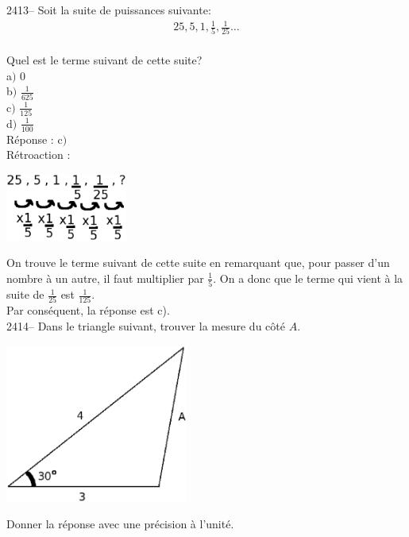 \documentclass[letterpaper, 12pt]{article}
\begin{document}
2413-- Soit la suite de puissances suivante:\\
\begin{eqnarray*}
25, 5, 1, \frac{1}{5}, \frac{1}{25} \ldots
\end{eqnarray*}\\
Quel est le terme suivant de cette suite?\\

a$)$ 0\\
b$)$ $\frac{1}{625}$\\[2mm]
c$)$ $\frac{1}{125}$\\[2mm]
d$)$ $\frac{1}{100}$\\[2mm]

R\'eponse : c$)$\\

R\'etroaction :\\
\begin{center}
 \includegraphics[width=4cm,bb=14 14 296 172]{Q2413.eps}
\end{center}
On trouve le terme suivant de cette suite en remarquant que, pour passer d'un nombre \`a un autre, il faut multiplier par $\frac{1}{5}$. On a donc que le terme qui vient \`a la suite de $\frac{1}{25}$ est $\frac{1}{125}$.\\
Par cons\'equent, la r\'eponse est c).\\

2414-- Dans le triangle suivant, trouver la mesure du c\^ot\'e $A$.\\
\begin{center}
 \includegraphics[width=6cm,bb=0 491 494 842]{Q2414.eps}
\end{center}
Donner la r\'eponse avec une pr\'ecision \`a l'unit\'e.\\
\end{document}
